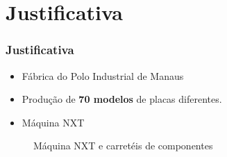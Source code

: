 \documentclass{beamer}
\begin{document}
\section{Justificativa}
\begin{frame}
\tableofcontents[ 
    currentsubsection, 
    hideothersubsections, 
    sectionstyle=show/shaded
    ] 
\end{frame}
\begin{frame}
\frametitle{Justificativa}
\begin{itemize}
\item Fábrica do Polo Industrial de Manaus
\item Produção de \textbf{70 modelos} de placas diferentes.
\item Máquina NXT 
\end{itemize}


\begin{figure}[h]
\centering
{}
\quad 
{}
\caption{Máquina NXT e carretéis de componentes}
\end{figure}

\end{frame}
\end{document}
